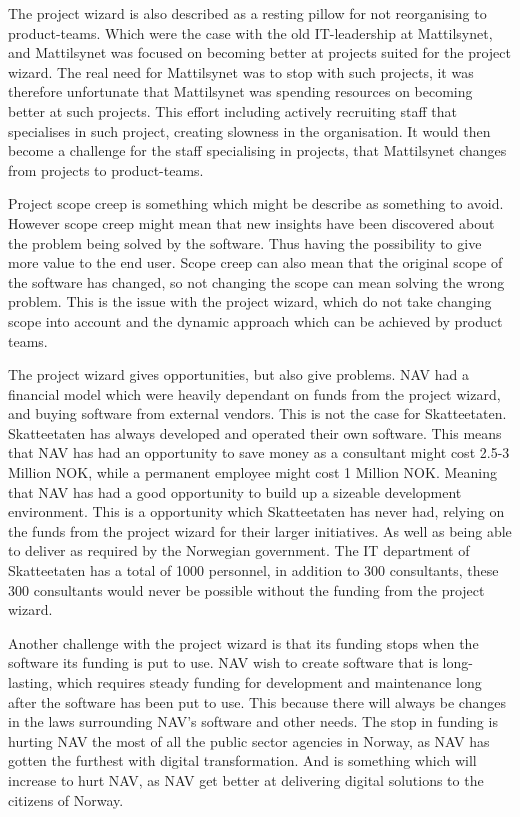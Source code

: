 The project wizard is also described as a resting pillow for not reorganising to product-teams. Which were the case with the old IT-leadership at Mattilsynet, and Mattilsynet was focused on becoming better at projects suited for the project wizard. The real need for Mattilsynet was to stop with such projects, it was therefore unfortunate that Mattilsynet was spending resources on becoming better at such projects. This effort including actively recruiting staff that specialises in such project, creating slowness in the organisation. It would then become a challenge for the staff specialising in projects, that Mattilsynet changes from projects to product-teams.

Project scope creep is something which might be describe as something to avoid. However scope creep might mean that new insights have been discovered about the problem being solved by the software. Thus having the possibility to give more value to the end user. Scope creep can also mean that the original scope of the software has changed, so not changing the scope can mean solving the wrong problem. This is the issue with the project wizard, which do not take changing scope into account and the dynamic approach which can be achieved by product teams.

The project wizard gives opportunities, but also give problems. NAV had a financial model which were heavily dependant on funds from the project wizard, and buying software from external vendors. This is not the case for Skatteetaten. Skatteetaten has always developed and operated their own software. This means that NAV has had an opportunity to save money as a consultant might cost 2.5-3 Million NOK, while a permanent employee might cost 1 Million NOK. Meaning that NAV has had a good opportunity to build up a sizeable development environment. This is a opportunity which Skatteetaten has never had, relying on the funds from the project wizard for their larger initiatives. As well as being able to deliver as required by the Norwegian government. The IT department of Skatteetaten has a total of 1000 personnel, in addition to 300 consultants, these 300 consultants would never be possible without the funding from the project wizard.

Another challenge with the project wizard is that its funding stops when the software its funding is put to use. NAV wish to create software that is long-lasting, which requires steady funding for development and maintenance long after the software has been put to use. This because there will always be changes in the laws surrounding NAV's software and other needs. The stop in funding is hurting NAV the most of all the public sector agencies in Norway, as NAV has gotten the furthest with digital transformation. And is something which will increase to hurt NAV, as NAV get better at delivering digital solutions to the citizens of Norway.


